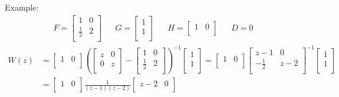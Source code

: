 Example:
\begin{align*}
    F = \begin{bmatrix}
        1 & 0\\
        \frac{1}{2} & 2\\
    \end{bmatrix}
    &&
    G = \begin{bmatrix}
        1\\
        1\\
    \end{bmatrix}
    &&
    H = \begin{bmatrix}
        1 & 0\\
    \end{bmatrix}
    &&
    D = 0
\end{align*}
\begin{align*}
W(z) &=
\begin{bmatrix}
    1 & 0\\
\end{bmatrix}
\left( \begin{bmatrix}
    z & 0\\
    0 & z\\
\end{bmatrix}
-
\begin{bmatrix}
    1 & 0 \\
    \frac{1}{2} & 2\\
\end{bmatrix}\right)^{-1}
\begin{bmatrix}
    1\\
    1\\
\end{bmatrix}
= \begin{bmatrix}
    1 & 0\\
\end{bmatrix}
\begin{bmatrix}
    z-1 & 0\\
    -\frac{1}{2} & z-2\\
\end{bmatrix}^{-1}
\begin{bmatrix}
    1\\
    1\\
\end{bmatrix}\\
&= \begin{bmatrix}
    1 & 0\\
\end{bmatrix}
\frac{1}{(z-1)(z-2)}
\begin{bmatrix}
    z-2 & 0\\

\end{bmatrix}
\end{align*}
